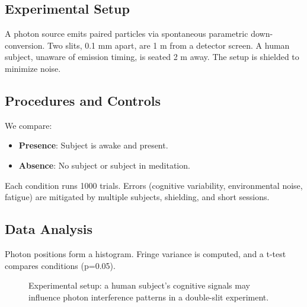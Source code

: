 \documentclass[12pt]{article}
\begin{document}
\subsection{Experimental Setup}
A photon source emits paired particles via spontaneous parametric down-conversion. Two slits, 0.1 mm apart, are 1 m from a detector screen. A human subject, unaware of emission timing, is seated 2 m away. The setup is shielded to minimize noise.

\subsection{Procedures and Controls}
We compare:
\begin{itemize}
    \item \textbf{Presence}: Subject is awake and present.
    \item \textbf{Absence}: No subject or subject in meditation.
\end{itemize}
Each condition runs 1000 trials. Errors (cognitive variability, environmental noise, fatigue) are mitigated by multiple subjects, shielding, and short sessions.

\subsection{Data Analysis}
\begin{sloppypar}
Photon positions form a histogram. Fringe variance is computed, and a t-test compares conditions (p=0.05).
\end{sloppypar}

\begin{figure}[!ht]
\vspace{0.5cm}
\centering
{}
\caption{Experimental setup: a human subject's cognitive signals may influence photon interference patterns in a double-slit experiment.}
\label{fig:setup}
\vspace{0.5cm}
\end{figure}
\end{document}
